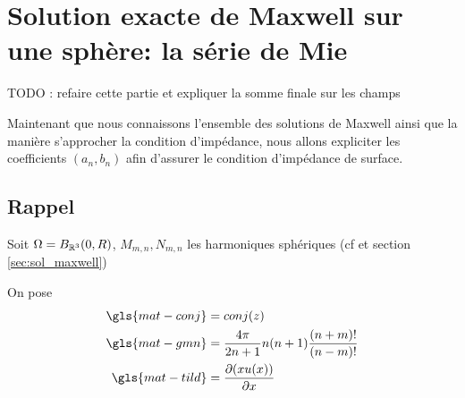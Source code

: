 \section{Solution exacte de Maxwell sur une sphère: la série de Mie}\label{sec:serie_mie}

{
\color{red} TODO : refaire cette partie et expliquer la somme finale sur les champs	
}

Maintenant que nous connaissons l'ensemble des solutions de Maxwell ainsi que la manière s'approcher la condition d'impédance, nous allons expliciter les coefficients $(a_n,b_n)$  afin d'assurer le condition d'impédance de surface.


\subsection{Rappel}
Soit $\Omega = B_{\mathbb R^3}(0,R)$, $M_{m,n}, N_{m,n}$ les harmoniques sphériques (cf \cite{marceaux_high-order_2000} et section \ref{sec:sol_maxwell})


On pose
\begin{align*}
  \gls{mat-conj} &=conj(z)\\
  \gls{mat-gmn} &=\frac{4\pi}{2n+1}n(n+1)\frac{(n+m)!}{(n-m)!}\\
  \gls{mat-tild} &= \dr{x}{(xu(x))}
\end{align*}


